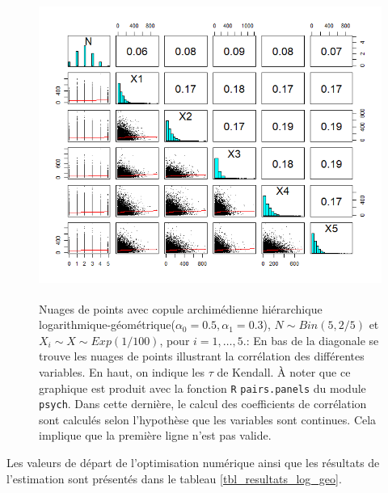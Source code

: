 \documentclass{article}
\begin{document}
	\begin{figure}[H]
		\centering
		\includegraphics[height=10cm]{Graph/scatterplot_log_geo.png}
		\caption[Nuages de points du scénario \ref{scenario_log_geo}]
		{Nuages de points avec copule archimédienne hiérarchique logarithmique-géométrique($\alpha_0=0.5, \alpha_1 = 0.3$), $N \sim Bin(5, 2/5)$ et $X_i \sim X \sim Exp(1/100)$, pour $i=1,\dots, 5$.:
			En bas de la diagonale se trouve les nuages de points illustrant la corrélation des différentes variables. En haut, on indique les $\tau$ de Kendall. À noter que ce graphique est produit avec la fonction \texttt{R} \texttt{pairs.panels} du module \texttt{psych}. Dans cette dernière, le calcul des coefficients de corrélation sont calculés selon l'hypothèse que les variables sont continues. Cela implique que la première ligne n'est pas valide.}
		\label{graph_scatterplot_log_geo}
	\end{figure}
	
	Les valeurs de départ de l'optimisation numérique ainsi que les résultats de l'estimation sont présentés dans le tableau \ref{tbl_resultats_log_geo}.
	
\end{document}
